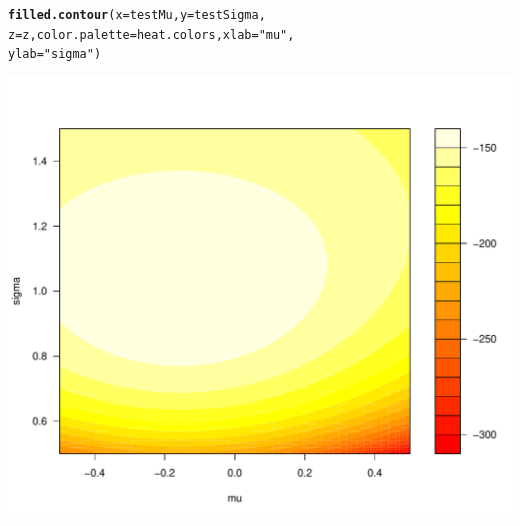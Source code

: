 \documentclass[xcolor=dvipsnames]{beamer}\usepackage[]{graphicx}\usepackage[]{color}
\makeatletter
\def\maxwidth{ %
  \ifdim\Gin@nat@width>\linewidth
    \linewidth
  \else
    \Gin@nat@width
  \fi
}
\newcommand{\hlstr}[1]{\textcolor[rgb]{0.192,0.494,0.8}{#1}}%
\newcommand{\hlstd}[1]{\textcolor[rgb]{0.345,0.345,0.345}{#1}}%
\newcommand{\hlkwc}[1]{\textcolor[rgb]{0.333,0.667,0.333}{#1}}%
\newcommand{\hlkwd}[1]{\textcolor[rgb]{0.737,0.353,0.396}{\textbf{#1}}}%
\newenvironment{kframe}{%
 \def\at@end@of@kframe{}%
 \ifinner\ifhmode%
  \def\at@end@of@kframe{\end{minipage}}%
  \begin{minipage}{\columnwidth}%
 \fi\fi%
 \def\FrameCommand##1{\hskip\@totalleftmargin \hskip-\fboxsep
 \colorbox{shadecolor}{##1}\hskip-\fboxsep
     \hskip-\linewidth \hskip-\@totalleftmargin \hskip\columnwidth}%
 \MakeFramed {\advance\hsize-\width
   \@totalleftmargin\z@ \linewidth\hsize
   \@setminipage}}%
 {\par\unskip\endMakeFramed%
 \at@end@of@kframe}
\newenvironment{knitrout}{}{} %
\makeatother
\begin{document}
\begin{frame}[fragile]
\begin{knitrout}
\color{fgcolor}\begin{kframe}
\begin{alltt}
\hlkwd{filled.contour}\hlstd{(}\hlkwc{x} \hlstd{= testMu,} \hlkwc{y} \hlstd{= testSigma,}
    \hlkwc{z} \hlstd{= z,} \hlkwc{color.palette} \hlstd{= heat.colors,} \hlkwc{xlab} \hlstd{=} \hlstr{"mu"}\hlstd{,}
    \hlkwc{ylab} \hlstd{=} \hlstr{"sigma"}\hlstd{)}
\end{alltt}
\end{kframe}
\end{knitrout}

\end{frame}

\begin{frame}[fragile]
\begin{knitrout}
\color{fgcolor}
\includegraphics[width=\maxwidth]{figure/TwoDimPlotOutput} 

\end{knitrout}

\end{frame}
\end{document}
